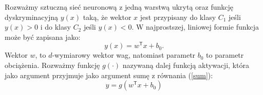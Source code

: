 \documentclass[11pt]{book}
\theoremstyle{definition}
\begin{document}
Rozważmy sztuczną sieć neuronową z jedną warstwą ukrytą oraz funkcję dyskryminacyjną $y(x)$ taką, że wektor $x$ jest przypisany do klasy $C_1$ jeśli $y(x) > 0$ i do klasy $C_2$ jeśli $y(x) < 0$. W najprostszej, liniowej formie funkcja może być zapisana jako:
%
\begin{equation}
y(x) = w^\mathsf{T} x + b_0.
\label{sum}
\end{equation}
%
Wektor $w$, to $d$-wymiarowy wektor wag, natomiast parametr $b_0$ to parametr obciążenia.
%
Rozważmy funkcję $g(\cdot)$ nazywaną dalej funkcją aktywacji, która jako argument przyjmuje jako argument sumę z równania (\ref{sum}):
%
\begin{equation}
y = g\left(w^\mathsf{T} x + b_0 \right)
\label{suma}
\end{equation}
%
\def\layersep{2.5cm}
\end{document}
